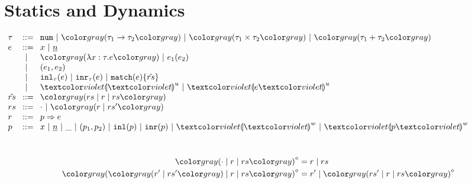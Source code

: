 \section{Statics and Dynamics}
$\arraycolsep=4pt\begin{array}{lll}
\tau & ::= &
  \tnum ~\vert~
  \tarr{\tau_1}{\tau_2} ~\vert~
  \tprod{\tau_1}{\tau_2} ~\vert~
  \tsum{\tau_1}{\tau_2} \\
e & ::= &
  x ~\vert~
  \hnum{n} \\
  & ~\vert~ &
  \hlam{x}{\tau}{e} ~\vert~
  \hap{e_1}{e_2} \\
  & ~\vert~ &
  \hpair{e_1}{e_2} \\
  & ~\vert~ &
  \hinl{\tau}{e} ~\vert~
  \hinr{\tau}{e} ~\vert~
  \hmatch{e}{\hat{rs}} \\
  & ~\vert~ &
  \hehole{u} ~\vert~
  \hhole{e}{u} \\
\hat{rs} & ::= &
  \inparens{\zruls{rs}{r}{rs}} \\
rs & ::= &
  \cdot ~\vert~ \hrulesP{r}{rs'} \\
r & ::= &
  \hrul{p}{e} \\
p & ::= &
  x ~\vert~
  \hnum{n} ~\vert~
  \_ ~\vert~
  \hpair{p_1}{p_2} ~\vert~
  \hinlp{p} ~\vert~
  \hinrp{p} ~\vert~
  \hehole{w} ~\vert~
  \hhole{p}{w}
\end{array}$

~~
\begin{subequations}\label{defn:rmpointer}
\begin{align}
  \rmpointer{\zruls{\cdot}{r}{rs}} &= \hrules{r}{rs} \\
  \rmpointer{\zruls{\hrulesP{r'}{rs'}}{r}{rs}} &= \hrules{r'}{\rmpointer{\zruls{rs'}{r}{rs}}}
\end{align}
\end{subequations}


